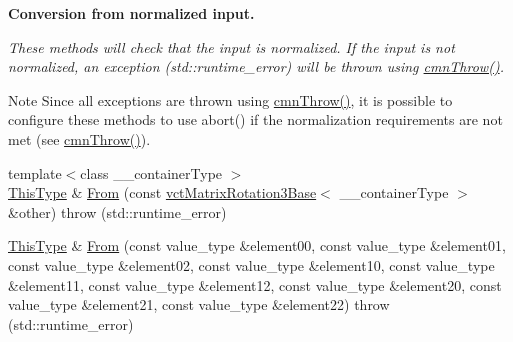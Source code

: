 \begin{Indent}{\bf Conversion from normalized input.}\par
{\em These methods will check that the input is normalized. If the input is not normalized, an exception ({\ttfamily std\+::runtime\+\_\+error}) will be thrown using \hyperlink{_minimal_cmn_8h_ad50e82cf9c9dbd0e6443c13e0d1a6f1a}{cmn\+Throw()}.

\begin{DoxyNote}{Note}
Since all exceptions are thrown using \hyperlink{_minimal_cmn_8h_ad50e82cf9c9dbd0e6443c13e0d1a6f1a}{cmn\+Throw()}, it is possible to configure these methods to use {\ttfamily abort()} if the normalization requirements are not met (see \hyperlink{_minimal_cmn_8h_ad50e82cf9c9dbd0e6443c13e0d1a6f1a}{cmn\+Throw()}). 
\end{DoxyNote}
}\begin{DoxyCompactItemize}
\item 
{\footnotesize template$<$class \+\_\+\+\_\+container\+Type $>$ }\\\hyperlink{classvct_matrix_rotation3_base_a027be766cb10ca3c2ad8e85c28ed0af9}{This\+Type} \& \hyperlink{classvct_matrix_rotation3_base_afb96603eae3080e013984aa908408f73}{From} (const \hyperlink{classvct_matrix_rotation3_base}{vct\+Matrix\+Rotation3\+Base}$<$ \+\_\+\+\_\+container\+Type $>$ \&other)  throw (std\+::runtime\+\_\+error)
\item 
\hyperlink{classvct_matrix_rotation3_base_a027be766cb10ca3c2ad8e85c28ed0af9}{This\+Type} \& \hyperlink{classvct_matrix_rotation3_base_a6a9a39413baedf9bd409f06d3cf330dd}{From} (const value\+\_\+type \&element00, const value\+\_\+type \&element01, const value\+\_\+type \&element02, const value\+\_\+type \&element10, const value\+\_\+type \&element11, const value\+\_\+type \&element12, const value\+\_\+type \&element20, const value\+\_\+type \&element21, const value\+\_\+type \&element22)  throw (std\+::runtime\+\_\+error)
\item 

\end{DoxyCompactItemize}
\end{Indent}
